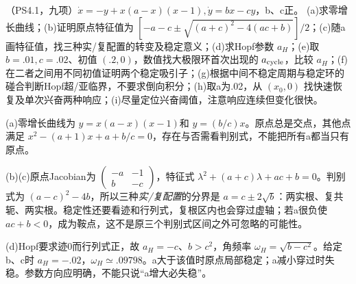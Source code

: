 \begin{exercise}\label{task:chaos-PS4-1}
（PS4.1，九项）$\dot x=-y+x(a-x)(x-1),\dot y=bx-cy$，b、c正。
(a)求零增长曲线；(b)证明原点特征值为 $[-a-c\pm\sqrt{(a+c)^2-4(ac+b)}]/2$；(c)随a画特征值，找三种实/复配置的转变及稳定意义；(d)求Hopf参数 $a_H$；(e)取 $b=.01,c=.02$、初值 $(.2,0)$，数值找大极限环首次出现的 $a_{\rm cycle}$，比较 $a_H$；(f)在二者之间用不同初值证明两个稳定吸引子；(g)根据中间不稳定周期与稳定环的碰合判断Hopf超/亚临界，不要求倒向积分；(h)取a为.02，从 $(x_0,0)$ 找快速恢复及单次兴奋两种响应；(i)尽量定位兴奋阈值，注意响应连续但变化很快。
\end{exercise}
\begin{solution}
(a)零增长曲线为 $y=x(a-x)(x-1)$和 $y=(b/c)x$。原点总是交点，其他点满足 $x^2-(a+1)x+a+b/c=0$，存在与否需看判别式，不能把所有a都当只有原点。

(b)(c)原点Jacobian为 $\left(\begin{smallmatrix}-a&-1\\b&-c\end{smallmatrix}\right)$，特征式 $\lambda^2+(a+c)\lambda+ac+b=0$。判别式为 $(a-c)^2-4b$，所以三种\emph{实/复配置}的分界是 $a=c\pm2\sqrt b$：两实根、复共轭、两实根。稳定性还要看迹和行列式，复根区内也会穿过虚轴；若a很负使 $ac+b<0$，成为鞍点，这不是原三个判别式区间之外可忽略的可能性。

(d)Hopf要求迹0而行列式正，故 $a_H=-c$、$b>c^2$，角频率 $\omega_H=\sqrt{b-c^2}$。给定b、c时 $a_H=-.02$，$\omega_H\simeq.09798$。a大于该值时原点局部稳定；a减小穿过时失稳。参数方向应明确，不能只说“a增大必失稳”。
\begin{center}\hfill{}\end{center}


\end{solution}
